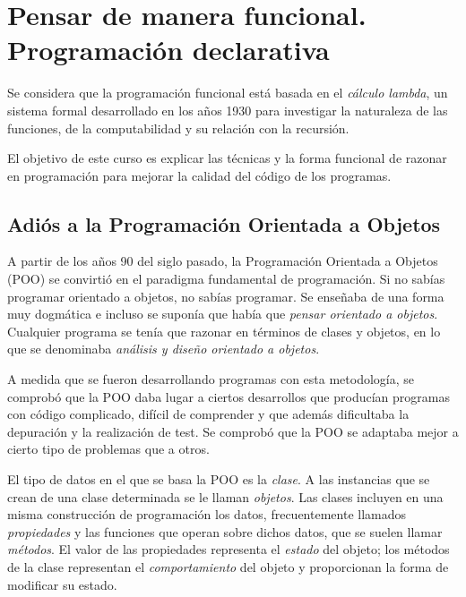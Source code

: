 \chapter{Pensar de manera funcional. Programación declarativa}
\label{ch_intro}

\IndiceCapitulo
\begin{Resumen}
   Se considera que la programación funcional está basada en el \textit{cálculo lambda},  un sistema formal desarrollado en los años 1930 para investigar la naturaleza de las funciones, de la computabilidad y su relación con la recursión. 
   
   \smallskip
   
   El objetivo de este curso es explicar las técnicas y la forma funcional de razonar en programación para mejorar la calidad del código de los programas.
\end{Resumen}

\section{Adiós a la Programación Orientada a Objetos}
\label{sec_adios_poo}
\noindent A partir de los años 90 del siglo pasado, la Programación Orientada a Objetos (POO) se convirtió en el paradigma fundamental de programación. Si no sabías programar orientado a objetos, no sabías programar. Se enseñaba de una forma muy dogmática e incluso se suponía que había que \textit{pensar orientado a objetos}. Cualquier programa se tenía que razonar en términos de clases y objetos, en lo que se denominaba \textit{análisis y diseño orientado a objetos}.

A medida que se fueron desarrollando programas con esta metodología, se comprobó que la POO daba lugar a ciertos desarrollos que producían programas con código complicado, difícil de comprender y que además dificultaba la depuración y la realización de test. Se comprobó que la POO se adaptaba mejor a cierto tipo de problemas que a otros.

El tipo de datos en el que se basa la POO es la \textit{clase}. A las instancias que se crean de una clase determinada se le llaman \textit{objetos}. Las clases incluyen en una misma construcción de programación los datos, frecuentemente llamados \textit{propiedades} y las funciones que operan sobre dichos datos, que se suelen llamar \textit{métodos}. El valor de las propiedades representa el \textit{estado} del objeto; los métodos de la clase representan el \textit{comportamiento} del objeto y proporcionan la forma de modificar su estado.
   
